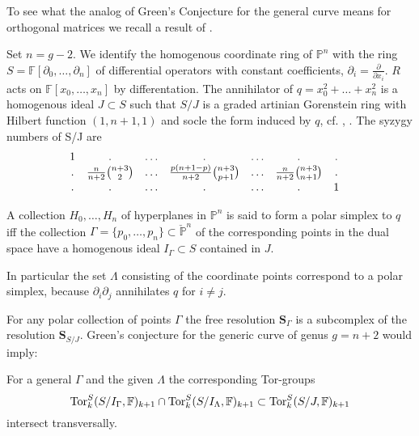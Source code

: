 \documentclass[12pt,leqno]{amsart}
\newcommand{\FF}{{\mathbb F}}
\newcommand{\PP}{{\mathbb P}}
\newcommand{\Ss}{{\mathbf S}}
\newcommand{\Tor}{{\rm{Tor}}}
\newlength{\ho}
\begin{document}
To see what the analog of Green's Conjecture for the general curve means for
orthogonal matrices we recall a result of \cite{RS1}.

Set $n=g-2$. We identify the homogenous coordinate ring of $\PP^n$ with
the ring $S=\FF[\partial_0,\ldots,\partial_n]$ of 
differential operators with 
constant coefficients, $\partial_i=\frac{\partial}{\partial x_i}$. 
$R$ acts on $\FF[x_0,\ldots,x_n]$ by differentation. 
The annihilator of $q=x_0^2+\ldots+x_n^2$ is a homogenous ideal 
$J \subset S$ such that 
$S/J$ is a graded artinian Gorenstein ring with Hilbert function $(1,n+1,1)$ 
and socle the form induced by $q$, 
cf. \cite{RS2}, \cite[Section 21.2 and related exercise 21.7]{Ei}.
The syzygy numbers of S/J are
$$
\begin{matrix}
1 & . &\ldots& . & \ldots &.&.\cr
. &\frac{n}{n+2}\binom{n+3}{2} &\ldots & \frac{p(n+1-p)}{n+2}\binom{n+3}{p+1}
&\ldots &\frac{n}{n+2}\binom{n+3}{n+1} &.&\cr
.&.&\ldots&.&\ldots&.&1\cr  
\end{matrix}
$$ 

A collection $H_0,\ldots,H_n$ of hyperplanes in $\PP^n$ is said to 
form a polar simplex to $q$ 
iff the collection $\Gamma=\{p_0,\ldots,p_n\} \subset \check \PP^n$ 
of the corresponding points in the dual space have a homogenous ideal 
$I_\Gamma \subset S$ contained in $J$.

In particular the set $\Lambda$ consisting of the coordinate points correspond 
to a polar simplex, because 
$\partial_i\partial_j$ annihilates $q$ for $i\ne j$.

For any polar collection of points $\Gamma$  the free resolution
$\Ss_\Gamma$ is a subcomplex of the resolution $\Ss_{S/J}$. Green's conjecture
for the generic curve of genus $g=n+2$ would imply: 

\begin{conjecture}\label{PConj}  For a general
$\Gamma$ and the given  $\Lambda$ the corresponding Tor-groups
$$\Tor^S_k(S/I_\Gamma,\FF)_{k+1} \cap \Tor^S_k(S/I_\Lambda,\FF)_{k+1}
\subset \Tor^S_k(S/J,\FF)_{k+1}$$
intersect transversally.
\end{conjecture} 
\end{document}
